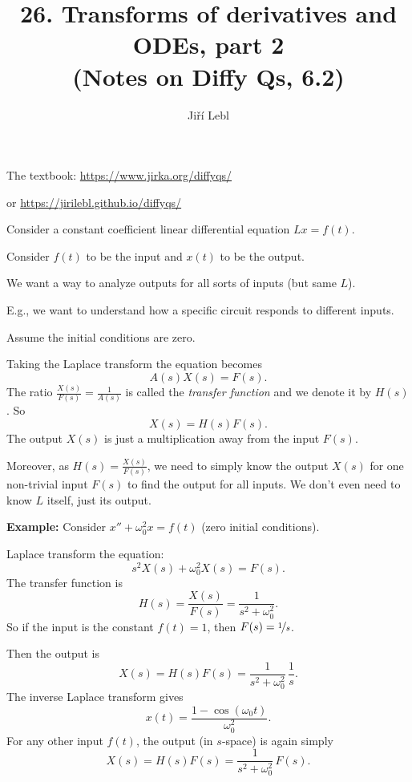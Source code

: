\documentclass[10pt,aspectratio=169]{beamer}
\author{Ji\v{r}\'i Lebl}
\institute[OSU]{%
Oklahoma State University%
}
\title{26. Transforms of derivatives and ODEs, part 2\\(Notes on Diffy Qs, 6.2)}
\date{}
\begin{document}
\begin{frame}
\titlepage


\begin{center}
The textbook: \url{https://www.jirka.org/diffyqs/}

or \url{https://jirilebl.github.io/diffyqs/}
\end{center}
\end{frame}

\begin{frame}
Consider a constant coefficient linear differential equation
$L x = f(t)$.

\medskip
\pause

Consider $f(t)$ to be the input and $x(t)$ to be the output.

\medskip
\pause

We want a way to analyze outputs for all sorts of inputs (but same $L$).

E.g., we want to understand how a specific circuit responds to different
inputs.

\medskip
\pause

Assume the initial conditions are zero.

\medskip
\pause

Taking the Laplace transform the equation becomes
\[
A(s) X(s) = F(s) .
\]
\pause
The ratio $\frac{X(s)}{F(s)} = \frac{1}{A(s)}$ is called the
\emph{transfer function} and we denote it by $H(s)$.
\pause
So
\[
X(s) = H(s) F(s) .
\]
The output $X(s)$ is just a multiplication away
from the input $F(s)$.

\medskip
\pause

Moreover, as 
$H(s) = \frac{X(s)}{F(s)}$, we need to simply know the output $X(s)$ for one
non-trivial input
$F(s)$ to find the output for all inputs.
\pause
We don't even need to know $L$ itself, just its output.
\end{frame}

\begin{frame}
\textbf{Example:}
Consider $x'' + \omega_0^2 x = f(t)$ (zero initial conditions).

\medskip
\pause

Laplace transform the equation:
\[
s^2 X(s) + \omega_0^2 X(s) = F(s) .
\]
\pause
The transfer function is
\[
H(s) = \frac{X(s)}{F(s)} = \frac{1}{s^2 + \omega_0^2} .
\]
\pause
So if the input is the constant $f(t)=1$, then $F(s)=\nicefrac{1}{s}$.

\medskip
\pause

Then the output is
\[
X(s) = H(s) F(s) = \frac{1}{s^2+\omega_0^2} \, \frac{1}{s} .
\]
\pause
The inverse Laplace transform gives
\[
x(t) = \frac{1-\cos(\omega_0 t)}{\omega_0^2} .
\]
\pause
For any other input $f(t)$, the output (in $s$-space) is again simply
\[
X(s) = H(s) F(s) = \frac{1}{s^2+\omega_0^2} \, F(s) .
\]
\end{frame}
\end{document}
